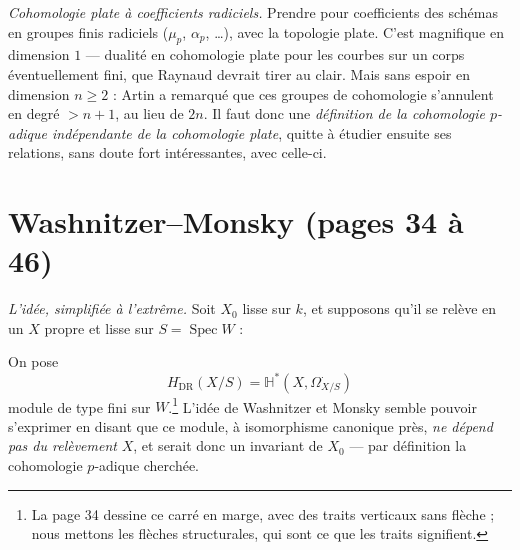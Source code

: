 \documentclass[11pt,a4paper]{article}
\begin{document}
\emph{Cohomologie plate à coefficients radiciels.} Prendre pour coefficients
des schémas en groupes finis radiciels ($\mu_p$, $\alpha_p$, \ldots), avec la
topologie plate. C'est magnifique en dimension $1$ — dualité en cohomologie
plate pour les courbes sur un corps éventuellement fini, que Raynaud devrait
tirer au clair. Mais sans espoir en dimension $n \geq 2$ : Artin a remarqué
que ces groupes de cohomologie s'annulent en degré $> n + 1$, au lieu de
$2n$. Il faut donc une \emph{définition de la cohomologie $p$-adique
indépendante de la cohomologie plate}, quitte à étudier ensuite ses
relations, sans doute fort intéressantes, avec celle-ci.

\section*{Washnitzer--Monsky (pages 34 à 46)}

\emph{L'idée, simplifiée à l'extrême.} Soit $X_0$ lisse sur $k$, et
supposons qu'il se relève en un $X$ propre et lisse sur $S =
\operatorname{Spec} W$ :


On pose
\[
  \boxed{\;H^{\cdot}_{\mathrm{DR}}(X/S) = \mathbb{H}^{*}(X, \Omega^{\cdot}_{X/S})\;}
\]
module de type fini sur $W$.\footnote{La page 34 dessine ce carré en marge,
avec des traits verticaux sans flèche ; nous mettons les flèches structurales,
qui sont ce que les traits signifient.} L'idée de Washnitzer et Monsky
semble pouvoir s'exprimer en disant que ce module, à isomorphisme canonique
près, \emph{ne dépend pas du relèvement} $X$, et serait donc un invariant de
$X_0$ — par définition la cohomologie $p$-adique cherchée.
\end{document}
